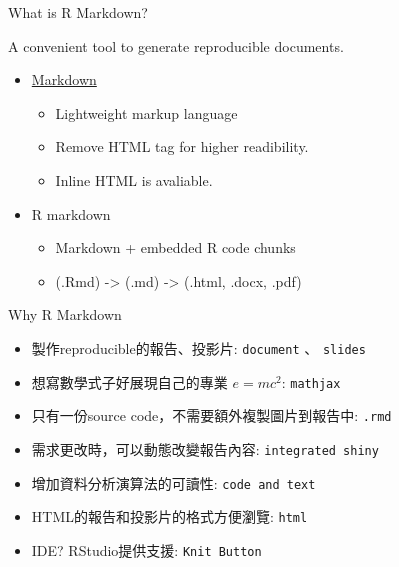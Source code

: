 \documentclass[ignorenonframetext,]{beamer}
\providecommand{\tightlist}{%
  \setlength{\itemsep}{0pt}\setlength{\parskip}{0pt}}
\begin{document}
\begin{frame}{What is R Markdown?}

A convenient tool to generate reproducible documents.

\begin{itemize}
\tightlist
\item
  \href{http://daringfireball.net/projects/markdown/basics}{Markdown}

  \begin{itemize}
  \tightlist
  \item
    Lightweight markup language
  \item
    Remove HTML tag for higher readibility.
  \item
    Inline HTML is avaliable.
  \end{itemize}
\item
  R markdown

  \begin{itemize}
  \tightlist
  \item
    Markdown + embedded R code chunks
  \item
    (.Rmd) -\textgreater{} (.md) -\textgreater{} (.html, .docx, .pdf)
  \end{itemize}
\end{itemize}

\end{frame}

\begin{frame}[fragile]{Why R Markdown}

\begin{itemize}
\tightlist
\item
  製作reproducible的報告、投影片: \texttt{document} 、 \texttt{slides}
\item
  想寫數學式子好展現自己的專業 \(e=mc^2\): \texttt{mathjax}
\item
  只有一份source code，不需要額外複製圖片到報告中: \texttt{.rmd}
\item
  需求更改時，可以動態改變報告內容: \texttt{integrated\ shiny}
\item
  增加資料分析演算法的可讀性: \texttt{code\ and\ text}
\item
  HTML的報告和投影片的格式方便瀏覽: \texttt{html}
\item
  IDE? RStudio提供支援: \texttt{Knit\ Button}
\end{itemize}

\end{frame}
\end{document}

